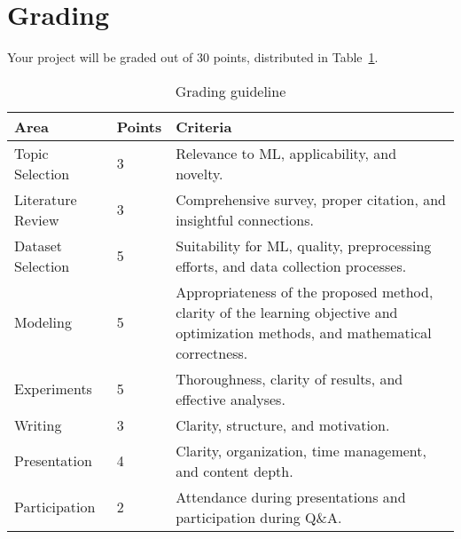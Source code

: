 \documentclass{article}
\begin{document}
\section{Grading}
Your project will be graded out of 30 points, distributed in Table~\ref{tab:grading}.

\begin{table}[h!]
\caption{Grading guideline}
\label{tab:grading}
\begin{tabular}{llp{3.5in}}
\toprule
\textbf{Area} & \textbf{Points} & \textbf{Criteria} \\
\hline
Topic Selection & 3 & Relevance to ML, applicability, and novelty. \\
Literature Review & 3 & Comprehensive survey, proper citation, and insightful connections. \\
Dataset Selection & 5 & Suitability for ML, quality, preprocessing efforts, and data collection processes. \\
Modeling & 5 & Appropriateness of the proposed method, clarity of the learning objective and optimization methods, and mathematical correctness. \\
Experiments & 5 & Thoroughness, clarity of results, and effective analyses. \\
Writing & 3 & Clarity, structure, and motivation. \\
Presentation & 4 & Clarity, organization, time management, and content depth. \\
Participation & 2 & Attendance during presentations and participation during Q\&A.\\
\bottomrule
\end{tabular}
\end{table}



\end{document}
